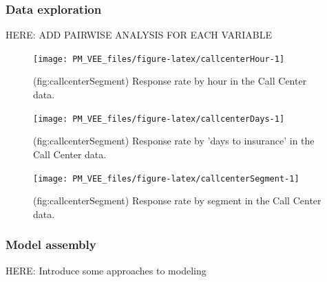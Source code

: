 \documentclass[12pt,]{krantz}
\begin{document}
\hypertarget{data-exploration-1}{%
\subsubsection{Data exploration}\label{data-exploration-1}}

HERE: ADD PAIRWISE ANALYSIS FOR EACH VARIABLE

\begin{figure}

{\centering \texttt{[image: PM\_VEE\_files/figure-latex/callcenterHour-1]} 

}

\caption{(fig:callcenterSegment) Response rate by hour in the Call Center data.}\label{fig:callcenterHour}
\end{figure}

\begin{figure}

{\centering \texttt{[image: PM\_VEE\_files/figure-latex/callcenterDays-1]} 

}

\caption{(fig:callcenterSegment) Response rate by 'days to insurance' in the Call Center data.}\label{fig:callcenterDays}
\end{figure}

\begin{figure}

{\centering \texttt{[image: PM\_VEE\_files/figure-latex/callcenterSegment-1]} 

}

\caption{(fig:callcenterSegment) Response rate by segment in the Call Center data.}\label{fig:callcenterSegment}
\end{figure}

\hypertarget{model-assembly-2}{%
\subsubsection{Model assembly}\label{model-assembly-2}}

HERE: Introduce some approaches to modeling
\end{document}
